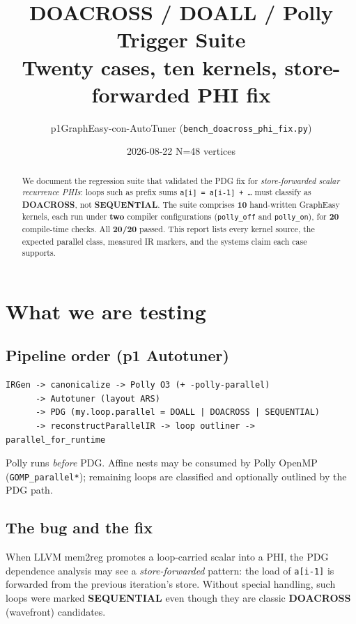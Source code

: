 \documentclass[11pt,a4paper]{article}
\title{\textbf{DOACROSS / DOALL / Polly Trigger Suite}\\[0.3em]
\large Twenty cases, ten kernels, store-forwarded PHI fix}
\author{p1GraphEasy-con-AutoTuner \quad (\texttt{bench\_doacross\_phi\_fix.py})}
\date{2026-08-22 \quad N=48 vertices}
\newcommand{\cfg}[1]{\texttt{#1}}
\begin{document}
\maketitle

\begin{abstract}
\noindent
We document the regression suite that validated the PDG fix for
\emph{store-forwarded scalar recurrence PHIs}: loops such as prefix sums
\texttt{a[i] = a[i-1] + \ldots} must classify as \textbf{DOACROSS}, not
\textbf{SEQUENTIAL}. The suite comprises \textbf{10} hand-written GraphEasy
kernels, each run under \textbf{two} compiler configurations
(\cfg{polly\_off} and \cfg{polly\_on}), for \textbf{20} compile-time checks.
All \textbf{20/20} passed. This report lists every kernel source, the
expected parallel class, measured IR markers, and the systems claim each case
supports.
\end{abstract}

\tableofcontents
\newpage

\section{What we are testing}

\subsection{Pipeline order (p1 Autotuner)}

\begin{verbatim}
IRGen -> canonicalize -> Polly O3 (+ -polly-parallel)
      -> Autotuner (layout ARS)
      -> PDG (my.loop.parallel = DOALL | DOACROSS | SEQUENTIAL)
      -> reconstructParallelIR -> loop outliner -> parallel_for_runtime
\end{verbatim}

Polly runs \emph{before} PDG. Affine nests may be consumed by Polly OpenMP
(\texttt{GOMP\_parallel*}); remaining loops are classified and optionally
outlined by the PDG path.

\subsection{The bug and the fix}

When LLVM mem2reg promotes a loop-carried scalar into a PHI, the PDG
dependence analysis may see a \emph{store-forwarded} pattern:
the load of \texttt{a[i-1]} is forwarded from the previous iteration's store.
Without special handling, such loops were marked \textbf{SEQUENTIAL} even though
they are classic \textbf{DOACROSS} (wavefront) candidates.
\end{document}
